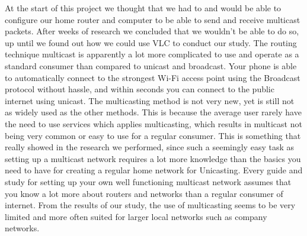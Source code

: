 \documentclass[9pt,a4paper]{acmproc}
\begin{document}
At the start of this project we thought that we had to and would be able to configure our home router and computer to be able to send and receive multicast packets. After weeks of research we concluded that we wouldn’t be able to do so, up until we found out how we could use VLC to conduct our study. The routing technique multicast is apparently a lot more complicated to use and operate as a standard consumer than compared to unicast and broadcast. Your phone is able to automatically connect to the strongest Wi-Fi access point using the Broadcast protocol without hassle, and within seconds you can connect to the public internet using unicast. The multicasting method is not very new, yet is still not as widely used as the other methods. This is because the average user rarely have the need to use services which applies multicasting, which results in multicast not being very common or easy to use for a regular consumer. This is something that really showed in the research we performed, since such a seemingly easy task as setting up a multicast network requires a lot more knowledge than the basics you need to have for creating a regular home network for Unicasting. Every guide and study for setting up your own well functioning multicast network assumes that you know a lot more about routers and networks than a regular consumer of internet. From the results of our study, the use of multicasting seems to be very limited and more often suited for larger local networks such as company networks.

\clearpage
\end{document}
